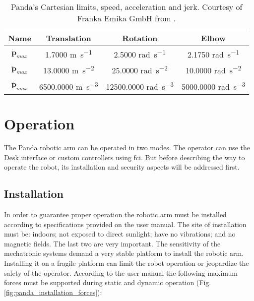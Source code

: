 \begin{table}[htbp]
    \caption[Panda's Cartesian limits, speed, acceleration and jerk.]{Panda's Cartesian limits, speed, acceleration and jerk. Courtesy of Franka Emika GmbH from \cite{FrankaEmikaGmbH_fci_documentation}.}
    \centering
    \begin{tabular}{c|c|c|c}
        \toprule
        \textbf{Name} & \textbf{Translation} & \textbf{Rotation} & \textbf{Elbow} \\
        \midrule
        $\dot{\boldsymbol{p}}_{max}$ & 1.7000 \si{\meter\per\second} & 2.5000 \si{\radian\per\second} & 2.1750 \si{\radian\per\second} \\
        $\ddot{\boldsymbol{p}}_{max}$ & 13.0000 \si{\meter\per\second\squared} & 25.0000 \si{\radian\per\second\squared} & 10.0000 \si{\radian\per\second\squared} \\
        $\dddot{\boldsymbol{p}}_{max}$ & 6500.0000 \si{\meter\per\second\cubed} & 12500.0000 \si{\radian\per\second\cubed} & 5000.0000 \si{\radian\per\second\cubed} \\
        \bottomrule
    \end{tabular}
    \label{tab:panda_cartesian_limits}
\end{table}




\section{Operation}
\label{sec:robotic_system_operation}

The Panda robotic arm can be operated in two modes. The operator can use the Desk interface or custom controllers using \gls{fci}. But before describing the way to operate the robot, its installation and security aspects will be addressed first.

\subsection{Installation}
\label{subsec:robotic_system_operation_installation}

In order to guarantee proper operation the robotic arm must be installed according to specifications provided on the user manual. The site of installation must be: indoors; not exposed to direct sunlight; have no vibrations; and no magnetic fields. The last two are very important. The sensitivity of the mechatronic systems demand a very stable platform to install the robotic arm. Installing it on a fragile platform can limit the robot operation or jeopardize the safety of the operator. According to the user manual the following maximum forces must be supported during static and dynamic operation (Fig. \ref{fig:panda_installation_forces}):

